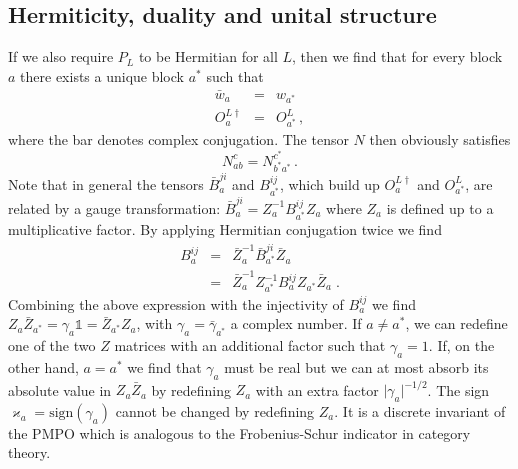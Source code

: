 \documentclass[12 pt]{article}
\begin{document}
\subsection{Hermiticity, duality and unital structure} \label{subsec:hermiticity}
If we also require $P_L$ to be Hermitian for all $L$, then we find that for every block $a$ there exists a unique block $a^*$ such that
\begin{eqnarray}
\bar{w}_a & = & w_{a^*} \label{realnumber} \\
O^{L\dagger}_a&  = & O^L_{a^*}\, ,
\end{eqnarray}
where the bar denotes complex conjugation. The tensor $N$ then obviously satisfies
\begin{equation} \label{pivotal3}
N_{ab}^c = N_{b^*a^*}^{c^*}\, .
\end{equation}
Note that in general the tensors $\bar{B}^{ji}_a$ and $B^{ij}_{a^*}$, which build up $O^{L\dagger}_a$ and $O^L_{a^*}$, are related by a gauge transformation: $\bar{B}^{ji}_a = Z^{-1}_aB^{ij}_{a^*}Z_a$ where $Z_{a}$ is defined up to a multiplicative factor. By applying Hermitian conjugation twice we find
\begin{eqnarray}
B^{ij}_{a} & = & \bar{Z}_a^{-1} \bar{B}^{ji}_{a^*} \bar{Z}_a \\
 & = & \bar{Z}_a^{-1} Z^{-1}_{a^*} B^{ij}_{a} Z_{a^*} \bar{Z}_a \; .
\end{eqnarray}
Combining the above expression with the injectivity of $B_a^{ij}$ we find $Z_{a}\bar{Z}_{a^\ast} = \gamma_a\mathds{1} = \bar{Z}_{a^*} Z_{a}$, with $\gamma_a=\bar{\gamma}_{a^*}$ a complex number. If $a\neq a^\ast$, we can redefine one of the two $Z$ matrices with an additional factor such that $\gamma_a=1$. If, on the other hand, $a=a^\ast$ we find that $\gamma_a$ must be real but we can at most absorb its absolute value in $Z_a \bar{Z}_a$ by redefining $Z_a$ with an extra factor $\lvert\gamma_a\rvert^{-1/2}$. The sign $\varkappa_a=\text{sign} (\gamma_a)$ cannot be changed by redefining $Z_a$. It is a discrete invariant of the PMPO which is analogous to the Frobenius-Schur indicator in category theory.
\end{document}
